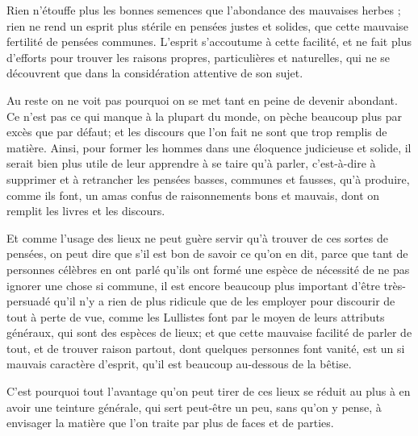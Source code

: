 Rien n'étouffe plus les bonnes semences que l'abondance des mauvaises herbes ; rien ne rend un esprit plus stérile en pensées justes et solides, que cette mauvaise fertilité de pensées communes. L'esprit s'accoutume à cette facilité, et ne fait plus d'efforts pour trouver les raisons propres, particulières et naturelles, qui ne se découvrent que dans la considération attentive de son sujet.

Au reste on ne voit pas pourquoi on se met tant en peine de devenir abondant. Ce n'est pas ce qui manque à la plupart du monde, on pèche beaucoup plus par excès que par défaut; et les discours que l'on fait ne sont que trop remplis de matière. Ainsi, pour former les hommes dans une éloquence judicieuse et solide, il serait bien plus utile de leur apprendre à se taire qu'à parler, c'est-à-dire à supprimer et à retrancher les pensées basses, communes et fausses, qu'à produire, comme ils font, un amas confus de raisonnements bons et mauvais, dont on remplit les livres et les discours.

Et comme l'usage des lieux ne peut guère servir qu'à trouver de ces sortes de pensées, on peut dire que s'il est bon de savoir ce qu'on en dit, parce que tant de personnes célèbres en ont parlé qu'ils ont formé une espèce de nécessité de ne pas ignorer une chose si commune, il est encore beaucoup plus important d'être très-persuadé qu'il n'y a rien de plus ridicule que de les employer pour discourir de tout à perte de vue, comme les Lullistes font par le moyen de leurs attributs généraux, qui sont des espèces de lieux; et que cette mauvaise facilité de parler de tout, et de trouver raison partout, dont quelques personnes font vanité, est un si mauvais caractère d'esprit, qu'il est beaucoup au-dessous de la bêtise.

C'est pourquoi tout l'avantage qu'on peut tirer de ces lieux se
réduit au plus à en avoir une teinture générale, qui sert peut-être
un peu, sans qu'on y pense, à envisager la matière que l'on traite
par plus de faces et de parties.
